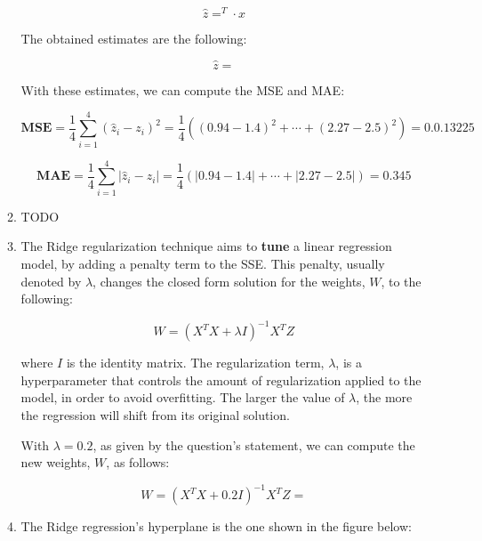 \documentclass[12pt]{article}
\begin{document}
\begin{enumerate}[leftmargin=\labelsep]
\begin{enumerate}
{                \begin{equation*}
                  \hat{z} = ^T \cdot x
                \end{equation*}

                The obtained estimates are the following:

                \begin{equation*}
                  \hat{z} = 
                \end{equation*}

                With these estimates, we can compute the MSE and MAE:

                $$
                  \mathbf{MSE} = \frac{1}{4} \sum_{i=1}^4 (\hat{z}_i - z_i)^2
                  = \frac{1}{4} \left( (0.94 - 1.4)^2 + \cdots + (2.27 - 2.5)^2 \right)
                  = 0.0.13225
                $$

                $$
                  \mathbf{MAE} = \frac{1}{4} \sum_{i=1}^4 |\hat{z}_i - z_i|
                  = \frac{1}{4} \left( |0.94 - 1.4| + \cdots + |2.27 - 2.5| \right)
                  = 0.345
                $$
                }
          \item {
                TODO
                }
          \item {
                The Ridge regularization technique aims to \textbf{tune} a linear regression model,
                by adding a penalty term to the SSE. This penalty, usually denoted by $\lambda$,
                changes the closed form solution for the weights, $W$, to the following:

                \begin{equation*}
                  W = (X^T X + \lambda I)^{-1} X^T Z
                \end{equation*}

                where $I$ is the identity matrix. The regularization term, $\lambda$,
                is a hyperparameter that controls the amount of regularization applied
                to the model, in order to avoid overfitting. The larger the value of
                $\lambda$, the more the regression will shift from its original solution.

                With $\lambda=0.2$, as given by the question's statement, we can compute
                the new weights, $W$, as follows:

                \begin{equation*}
                  W = (X^T X + 0.2 I)^{-1} X^T Z = 
                \end{equation*}
                }
          \item {
                The Ridge regression's hyperplane is the one shown in the figure below:

}
\end{enumerate}
\end{enumerate}
\end{document}
